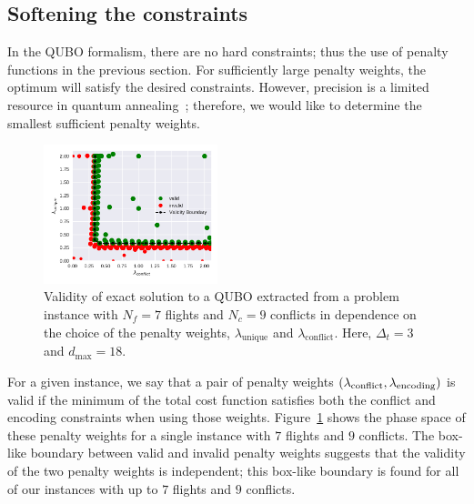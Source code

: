 \subsection{Softening the constraints}
In the QUBO formalism, there are no hard constraints; thus the use of penalty functions in the previous section.
For sufficiently large penalty weights, the optimum will satisfy the desired constraints.
However, precision is a limited resource in quantum annealing~\cite{TODO:D-Wave-precision}; therefore, we would like to determine the smallest sufficient penalty weights.

\begin{figure}[h]
\centering
\includegraphics[width=0.45\textwidth]{./pics/validity_boundary_example.pdf}
\caption[Penalty weight phase diagram]{Validity of exact solution to a QUBO extracted from a problem instance with $N_f=7$ flights and $N_c=9$ conflicts in dependence on the choice of the penalty weights, $\lambda_\text{unique}$ and $\lambda_\text{conflict}$. Here, $\Delta_t=3$ and $d_\text{max}=18$.}
\label{fig:penalty_weights}
\end{figure}

For a given instance, we say that a pair of penalty weights $(\lambda_{\mathrm{conflict}}, \lambda_{\mathrm{encoding}})$ is valid if the minimum of the total cost function satisfies both the conflict and encoding constraints when using those weights.
Figure~\ref{fig:penalty_weights} shows the phase space of these penalty weights for a single instance with $7$ flights and $9$ conflicts.
The box-like boundary between valid and invalid penalty weights suggests that the validity of the two penalty weights is independent; 
this box-like boundary is found for all of our instances with up to $7$ flights and $9$ conflicts.

